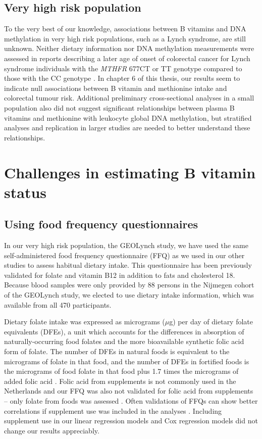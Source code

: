 \subsection{Very high risk population} %
To the very best of our knowledge, associations between B vitamins and DNA methylation in very high risk populations, such as a Lynch syndrome, are still unknown. Neither dietary information nor DNA methylation measurements were assessed in reports describing a later age of onset of colorectal cancer for Lynch syndrome individuals with the \emph{MTHFR} 677CT or TT genotype compared to those with the CC genotype \cite{c715,c16}. In chapter 6 of this thesis, our results seem to indicate null associations between B vitamin and methionine intake and colorectal tumour risk. Additional preliminary cross-sectional analyses in a small population also did not suggest significant relationships between plasma B vitamins and methionine with leukocyte global DNA methylation, but stratified analyses and replication in larger studies are needed to better understand these relationships. 
 
\section[]{Challenges in estimating B vitamin status} %
\subsection{Using food frequency questionnaires} %
In our very high risk population, the GEOLynch study, we have used the same self-administered food frequency questionnaire (FFQ) as we used in our other studies to assess habitual dietary intake. This questionnaire has been previously validated for folate and vitamin B12 \cite{c717} in addition to fats and cholesterol 18. Because blood samples were only provided by 88 persons in the Nijmegen cohort of the GEOLynch study, we elected to use dietary intake information, which was available from all 470 participants. 
 
\noindent Dietary folate intake was expressed as micrograms ($\mu$g) per day of dietary folate equivalents (DFEs), a unit which accounts for the differences in absorption of naturally-occurring food folates and the more bioavailable synthetic folic acid form of folate. The number of DFEs in natural foods is equivalent to the micrograms of folate in that food, and the number of DFEs in fortified foods is the micrograms of food folate in that food plus 1.7 times the micrograms of added folic acid \cite{c719}. Folic acid from supplements is not commonly used in the Netherlands \cite{c720} and our FFQ was also not validated for folic acid from supplements -- only folate from foods was assessed \cite{c717}. Often validations of FFQs can show better correlations if supplement use was included in the analyses \cite{c721,c722,c723}. Including supplement use in our linear regression models and Cox regression models did not change our results appreciably. 
 
